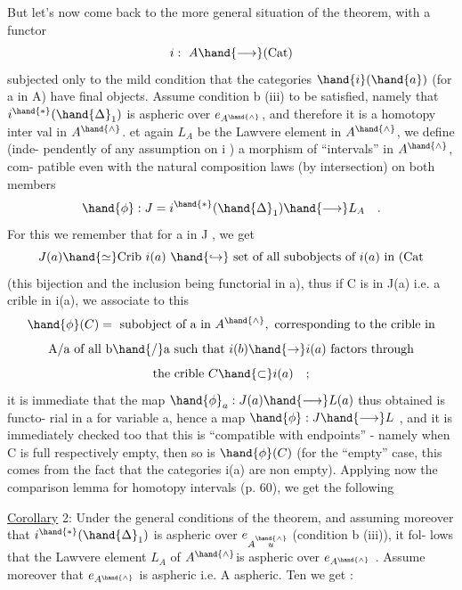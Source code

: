 But let's now come back to the more general situation of the theorem,
with a functor
\[ i:\ A\hand{\longrightarrow}(\mathrm{Cat}) \]
subjected only to the mild condition that the categories $\hand{i}(\hand{a})$ (for a in
A) have final objects.  Assume condition b (iii) to be satisfied, namely
that $i^{\hand{*}}(\hand{\Delta}_1)$ is aspheric over $e_{A^{\hand{\wedge}}}$,  and therefore it is a homotopy inter%
val in $A^{\hand{\wedge}}$.  et again $L_A$ be the Lawvere element in $A^{\hand{\wedge}}$, we define (inde-%
pendently of any assumption on i ) a morphism of ``intervals'' in $A^{\hand{\wedge}}$,  com-%
patible even with the natural composition laws (by intersection) on both
members
\[ \hand{\phi} : J = i^{\hand{*}}(\hand{\Delta}_1)\hand{\longrightarrow} L_A \quad . \]
For this we remember that  for a in J , we get
\[ J(a)\hand{\simeq} \mathrm{Crib}\ i(a) \ \hand{\ensuremath{\hookrightarrow}}\ \text{set of all subobjects of } i(a) \text{ in } (\mathrm{Cat} \]
(this bijection and the inclusion being functorial in a),  thus if C is
in J(a)  i.e. a crible in i(a),  we associate to this
\[ \hand{\phi}(C) = \text{ subobject of a in } A^{\hand{\wedge}}, \text{ corresponding to the crible in} \]
\[ \text{A/a of all b}\hand{/}\text{a such that } i(b)\hand{\to} i(a) \text{ factors through} \]
\[ \text{the crible } C\hand{\subset} i(a) \quad ; \]
it is immediate that the map  $\hand{\phi}_a : J(a)\hand{\longrightarrow} L(a)$  thus obtained is functo-%
rial in a for variable a,  hence a  map $\hand{\phi} : J\hand{\longrightarrow} L$ ,  and it is
immediately checked too that this is ``compatible with endpoints'' - namely
when C is full respectively empty,  then so is $\hand{\phi}(C)$  (for the ``empty''
case,  this comes from the fact that the categories i(a) are non empty).
Applying now the comparison lemma for homotopy intervals (p. 60),  we get
the following

\uline{Corollary} 2:  Under the general conditions of the theorem,  and assuming
moreover that $i^{\hand{*}}(\hand{\Delta}_1)$ is aspheric over $e_{A\overset{\hand{\wedge}}{u}}$ (condition b (iii)),  it fol-%
lows that the Lawvere element $L_A$ of $A^{\hand{\wedge}}$is aspheric over $e_{A^{\hand{\wedge}}}$ .  Assume
moreover that $e_{A^{\hand{\wedge}}}$ is aspheric i.e. A aspheric.  Ten we get :
